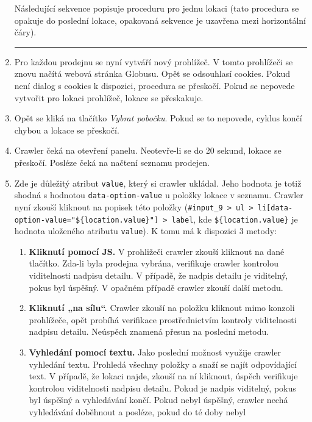 \begin{enumerate}
        Následující sekvence popisuje proceduru pro jednu lokaci (tato procedura
        se opakuje do poslední lokace, opakovaná sekvence je uzavřena mezi horizontální
        čáry).
        \hrule
    \item Pro každou prodejnu se nyní vytváří nový prohlížeč. V tomto prohlížeči
        se znovu načítá webová stránka Globusu. Opět se odsouhlasí cookies. Pokud
        není dialog s cookies k dispozici, procedura se přeskočí. Pokud se nepovede
        vytvořit pro lokaci prohlížeč, lokace se přeskakuje.
    \item Opět se kliká na tlačítko \emph{Vybrat pobočku}. Pokud se to nepovede,
        cyklus končí chybou a lokace se přeskočí.
    \item Crawler čeká na otevření panelu. Neotevře-li se do 20 sekund, lokace
        se přeskočí. Posléze čeká na načtení seznamu prodejen.
    \item Zde je důležitý atribut \texttt{value}, který si crawler ukládal.
        Jeho hodnota je totiž shodná s hodnotou \texttt{data-option-value} u položky
        lokace v seznamu. Crawler nyní zkouší kliknout na popisek této položky
        (\texttt{\#input\_9 > ul > li[data-option-value="\$\{location.value\}"] > label},
        kde \texttt{\$\{location.value\}} je hodnota uloženého atributu \texttt{value}).
        K tomu má k dispozici 3 metody:
        \begin{enumerate}
            \item \textbf{Kliknutí pomocí JS.} V prohližeči crawler zkouší kliknout
                na dané tlačítko. Zda-li byla prodejna vybrána, verifikuje crawler
                kontrolou viditelnosti nadpisu detailu. V případě, že nadpis detailu
                je viditelný, pokus byl úspěšný. V opačném případě crawler zkouší další
                metodu.
            \item \textbf{Kliknutí „na sílu“.} Crawler zkouší na položku kliknout
                mimo konzoli prohlížeče, opět probíhá verifikace prostřednictvím
                kontroly viditelnosti nadpisu detailu. Neúspěch znamená přesun na poslední
                metodu.
            \item \textbf{Vyhledání pomocí textu.} Jako poslední možnost využije
                crawler vyhledání textu. Prohledá všechny položky a snaží se najít
                odpovídající text. V případě, že lokaci najde, zkouší na ní kliknout,
                úspěch verifikuje kontrolou viditelnosti nadpisu detailu. Pokud je nadpis
                viditelný, pokus byl úspěšný a vyhledávání končí. Pokud nebyl úspěšný, crawler nechá vyhledávání doběhnout a posléze, pokud do té doby nebyl

\end{enumerate}
\end{enumerate}
